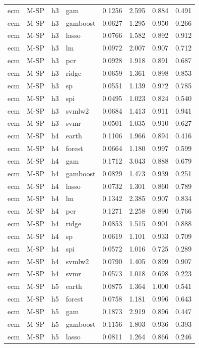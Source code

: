\begin{ThreePartTable}
\begin{longtable}[t]{llclcccc}
ecm & M-SP & h3 & gam & 0.1256 & 2.595 & 0.884 & 0.491\\
ecm & M-SP & h3 & gamboost & 0.0627 & 1.295 & 0.950 & 0.266\\
ecm & M-SP & h3 & lasso & 0.0766 & 1.582 & 0.892 & 0.912\\
ecm & M-SP & h3 & lm & 0.0972 & 2.007 & 0.907 & 0.712\\
ecm & M-SP & h3 & pcr & 0.0928 & 1.918 & 0.891 & 0.687\\
ecm & M-SP & h3 & ridge & 0.0659 & 1.361 & 0.898 & 0.853\\
ecm & M-SP & h3 & sp & 0.0551 & 1.139 & 0.972 & 0.785\\
ecm & M-SP & h3 & spi & 0.0495 & 1.023 & 0.824 & 0.540\\
ecm & M-SP & h3 & svmlw2 & 0.0684 & 1.413 & 0.911 & 0.941\\
ecm & M-SP & h3 & svmr & 0.0501 & 1.035 & 0.910 & 0.627\\
\addlinespace
ecm & M-SP & h4 & earth & 0.1106 & 1.966 & 0.894 & 0.416\\
ecm & M-SP & h4 & forest & 0.0664 & 1.180 & 0.997 & 0.599\\
ecm & M-SP & h4 & gam & 0.1712 & 3.043 & 0.888 & 0.679\\
ecm & M-SP & h4 & gamboost & 0.0829 & 1.473 & 0.939 & 0.251\\
ecm & M-SP & h4 & lasso & 0.0732 & 1.301 & 0.860 & 0.789\\
ecm & M-SP & h4 & lm & 0.1342 & 2.385 & 0.907 & 0.834\\
ecm & M-SP & h4 & pcr & 0.1271 & 2.258 & 0.890 & 0.766\\
ecm & M-SP & h4 & ridge & 0.0853 & 1.515 & 0.901 & 0.888\\
ecm & M-SP & h4 & sp & 0.0619 & 1.101 & 0.933 & 0.709\\
ecm & M-SP & h4 & spi & 0.0572 & 1.016 & 0.725 & 0.289\\
ecm & M-SP & h4 & svmlw2 & 0.0790 & 1.405 & 0.899 & 0.907\\
ecm & M-SP & h4 & svmr & 0.0573 & 1.018 & 0.698 & 0.223\\
\addlinespace
ecm & M-SP & h5 & earth & 0.0875 & 1.364 & 1.000 & 0.541\\
ecm & M-SP & h5 & forest & 0.0758 & 1.181 & 0.996 & 0.643\\
ecm & M-SP & h5 & gam & 0.1873 & 2.919 & 0.896 & 0.447\\
ecm & M-SP & h5 & gamboost & 0.1156 & 1.803 & 0.936 & 0.393\\
ecm & M-SP & h5 & lasso & 0.0811 & 1.264 & 0.866 & 0.246\\

\end{longtable}
\end{ThreePartTable}
